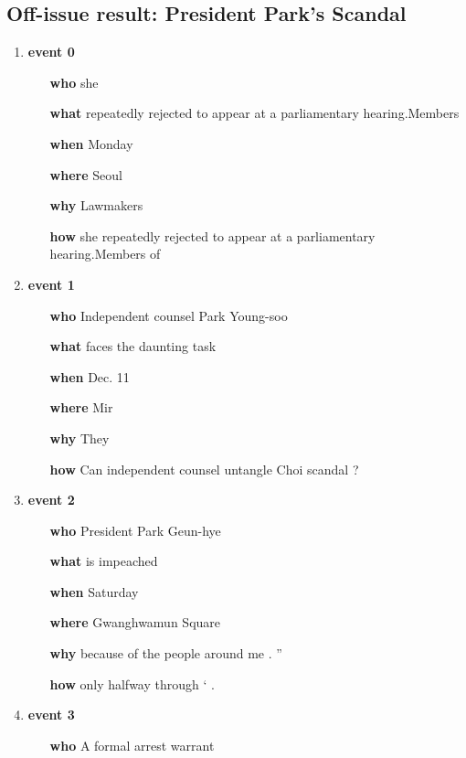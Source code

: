 \subsection{Off-issue result: President Park's Scandal}

\begin{enumerate}
        \item \textbf{	event		0	}
\begin{enumerate}
\item[\textbf{	who	}]	she
\item[\textbf{	what	}]	repeatedly	rejected	to	appear	at	a	parliamentary	hearing.Members
\item[\textbf{	when	}]	Monday
\item[\textbf{	where	}]	Seoul
\item[\textbf{	why	}]	Lawmakers
\item[\textbf{	how	}]	she	repeatedly	rejected	to	appear	at	a	parliamentary	hearing.Members	of
\end{enumerate}
\item \textbf{	event		1	}
\begin{enumerate}
\item[\textbf{	who	}]	Independent	counsel	Park	Young-soo
\item[\textbf{	what	}]	faces	the	daunting	task
\item[\textbf{	when	}]	Dec.	11
\item[\textbf{	where	}]	Mir
\item[\textbf{	why	}]	They
\item[\textbf{	how	}]	Can	independent	counsel	untangle	Choi	scandal	?
\end{enumerate}
\item \textbf{	event		2	}
\begin{enumerate}
\item[\textbf{	who	}]	President	Park	Geun-hye
\item[\textbf{	what	}]	is	impeached
\item[\textbf{	when	}]	Saturday
\item[\textbf{	where	}]	Gwanghwamun	Square
\item[\textbf{	why	}]	because	of	the	people	around	me	.	”
\item[\textbf{	how	}]	only	halfway	through	‘	.
\end{enumerate}
\item \textbf{	event		3	}
\begin{enumerate}
\item[\textbf{	who	}]	A	formal	arrest	warrant

\end{enumerate}
\end{enumerate}
